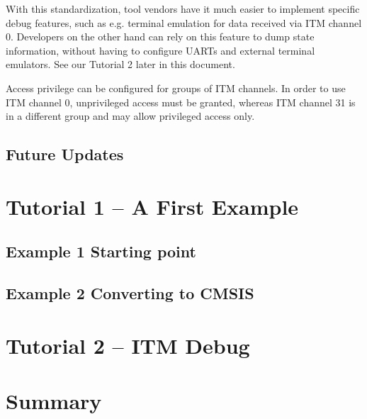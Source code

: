 With this standardization, tool vendors have it much easier to implement
specific debug features, such as e.g. terminal emulation for data received via
ITM channel 0. Developers on the other hand can rely on this feature to dump
state information, without having to configure UARTs and external terminal
emulators. See our Tutorial 2 later in this document.

Access privilege can be configured for groups of ITM channels. In order to use
ITM channel 0, unprivileged access must be granted, whereas ITM channel 31 is in
a different group and may allow privileged access only.

\subsection{Future Updates}
\section{Tutorial 1 – A First Example}
\subsection{Example 1 Starting point}
\subsection{Example 2 Converting to CMSIS}
\section{Tutorial 2 – ITM Debug}
\section{Summary}



